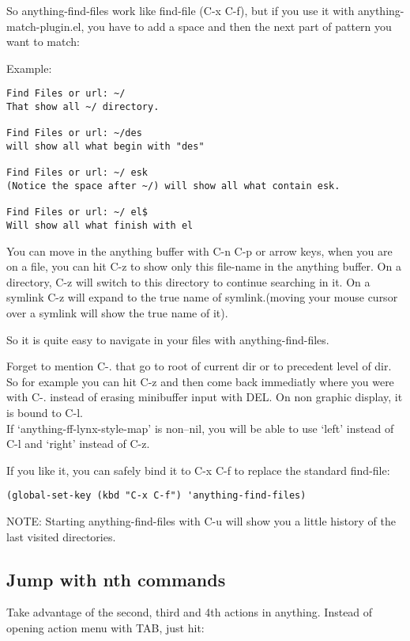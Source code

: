 \documentclass[a4paper,11pt]{article}
\begin{document}
So anything-find-files work like find-file (C-x C-f), but if you use it
with anything-match-plugin.el, you have to add a space and then the next
part of pattern you want to match:

Example:

\begin{verbatim}
Find Files or url: ~/
That show all ~/ directory.

Find Files or url: ~/des
will show all what begin with "des"

Find Files or url: ~/ esk
(Notice the space after ~/) will show all what contain esk.

Find Files or url: ~/ el$
Will show all what finish with el

\end{verbatim}
You can move in the anything buffer with C-n C-p or arrow keys, when you
are on a file, you can hit C-z to show only this file-name in the
anything buffer.
On a directory, C-z will switch to this directory to continue searching
in it.
On a symlink C-z will expand to the true name of symlink.(moving your
mouse cursor over a symlink will show the true name of it).

So it is quite easy to navigate in your files with anything-find-files.

Forget to mention C-. that go to root of current dir or to precedent
level of dir.
So for example you can hit C-z and then come back immediatly where you
were with C-. instead of erasing minibuffer input with DEL.
On non graphic display, it is bound to C-l.\\
If `anything-ff-lynx-style-map' is non--nil, you will be able to use `left' instead of C-l and `right' instead of C-z.

If you like it, you can safely bind it to C-x C-f to replace the standard
find-file:

\begin{verbatim}
(global-set-key (kbd "C-x C-f") 'anything-find-files)
\end{verbatim}

NOTE:
Starting anything-find-files with C-u will show you a little history of the last visited directories.


\subsection{Jump with nth commands}
\label{sec:jump-with-nth}
Take advantage of the second, third and 4th actions in anything.
Instead of opening action menu with TAB, just hit:
\end{document}
